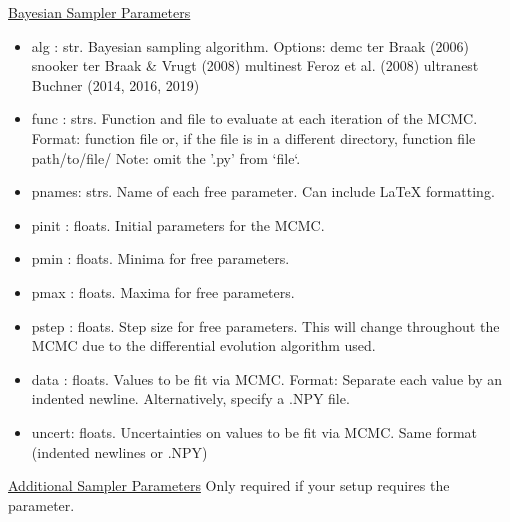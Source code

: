 \documentclass[letterpaper, 12pt]{article}
\begin{document}
\noindent \underline{Bayesian Sampler Parameters}
\begin{itemize}
\item alg   : str.  Bayesian sampling algorithm.  Options:
                      demc                 ter Braak (2006)
                      snooker      ter Braak & Vrugt (2008)
                      multinest         Feroz et al. (2008)
                      ultranest              Buchner (2014, 2016, 2019)
\item func  : strs. Function and file to evaluate at each iteration of 
                    the MCMC.
                    Format: 
                      function file
                    or, if the file is in a different directory,
                      function file path/to/file/
                    Note: omit the '.py' from `file`.
\item pnames: strs. Name of each free parameter. Can include LaTeX 
                    formatting.
\item pinit : floats. Initial parameters for the MCMC.
\item pmin  : floats. Minima for free parameters.
\item pmax  : floats. Maxima for free parameters.
\item pstep : floats. Step size for free parameters. 
                      This will change throughout the MCMC due to the 
                      differential evolution algorithm used.
\item data  : floats. Values to be fit via MCMC. 
                    Format: Separate each value by an indented newline.
                    Alternatively, specify a .NPY file.
\item uncert: floats. Uncertainties on values to be fit via MCMC. 
                      Same format (indented newlines or .NPY)
\end{itemize}


\noindent \underline{Additional Sampler Parameters}
Only required if your setup requires the parameter.
\end{document}
